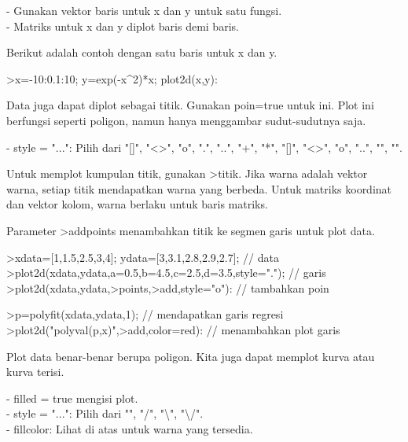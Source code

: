 \documentclass[12pt,arial,letterpaper]{book}
\begin{document}
\begin{eulernootebook}
\begin{eulercomment}
\begin{eulercomment}
\begin{eulernootebook}
\begin{eulercomment}
\begin{eulercomment}
\begin{eulercomment}
\begin{eulercomment}
\begin{eulercomment}
\begin{eulercomment}
\begin{eulercomment}
\begin{eulernotebook}
\begin{eulercomment}
\begin{eulercomment}
\begin{eulercomment}
\begin{eulercomment}
\begin{eulercomment}
- Gunakan vektor baris untuk x dan y untuk satu fungsi.\\
- Matriks untuk x dan y diplot baris demi baris. 

Berikut adalah contoh dengan satu baris untuk x dan y.


\end{eulercomment}
\begin{eulerprompt}
>x=-10:0.1:10; y=exp(-x^2)*x; plot2d(x,y):
\end{eulerprompt}
\begin{eulercomment}
Data juga dapat diplot sebagai titik. Gunakan poin=true untuk ini.
Plot ini berfungsi seperti poligon, namun hanya menggambar
sudut-sudutnya saja.

- style = "...": Pilih dari "[]", "\textless{}\textgreater{}", "o", ".", "..", "+", "*",
"[]", "\textless{}\textgreater{}", "o", "..", "", "\textbar{}".

Untuk memplot kumpulan titik, gunakan \textgreater{}titik. Jika warna adalah vektor
warna, setiap titik mendapatkan warna yang berbeda. Untuk matriks
koordinat dan vektor kolom, warna berlaku untuk baris matriks.

Parameter \textgreater{}addpoints menambahkan titik ke segmen garis untuk plot
data.
\end{eulercomment}
\begin{eulerprompt}
>xdata=[1,1.5,2.5,3,4]; ydata=[3,3.1,2.8,2.9,2.7]; // data
>plot2d(xdata,ydata,a=0.5,b=4.5,c=2.5,d=3.5,style="."); // garis
>plot2d(xdata,ydata,>points,>add,style="o"): // tambahkan poin
\end{eulerprompt}
\begin{eulerprompt}
>p=polyfit(xdata,ydata,1); // mendapatkan garis regresi
>plot2d("polyval(p,x)",>add,color=red): // menambahkan plot garis
\end{eulerprompt}
\begin{eulercomment}
Plot data benar-benar berupa poligon. Kita juga dapat memplot kurva
atau kurva terisi.

- filled = true mengisi plot.\\
- style = "...": Pilih dari "", "/", "\textbackslash{}", "\textbackslash{}/".\\
- fillcolor: Lihat di atas untuk warna yang tersedia.


\end{eulercomment}
\end{eulercomment}
\end{eulercomment}
\end{eulercomment}
\end{eulercomment}
\end{eulernotebook}
\end{eulercomment}
\end{eulercomment}
\end{eulercomment}
\end{eulercomment}
\end{eulercomment}
\end{eulercomment}
\end{eulercomment}
\end{eulernootebook}
\end{eulercomment}
\end{eulercomment}
\end{eulernootebook}
\end{document}
